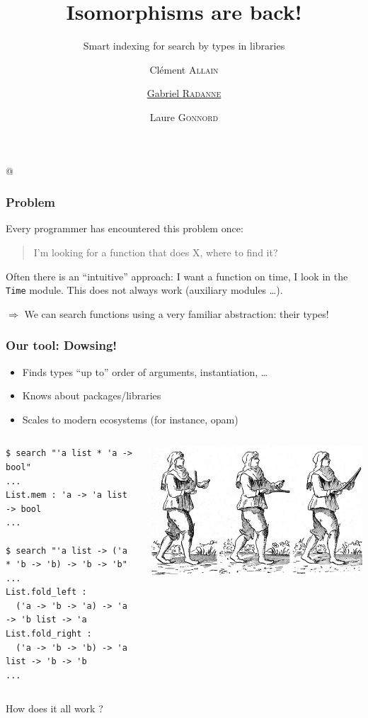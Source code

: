 \documentclass[aspectratio=169,dvipsnames,svgnames,10pt]{beamer}
\title{Isomorphisms are back!}
\subtitle{Smart indexing for search by types in libraries}
\author{
  Clément \textsc{Allain}
  \and
  \underline{Gabriel \textsc{Radanne}}
  \and
  Laure \textsc{Gonnord} \\
}
\date{}
\begin{document}
\lstMakeShortInline[keepspaces,basicstyle=\small\ttfamily]@

\begin{frame}
  \titlepage
\end{frame}

\begin{frame}[fragile]
  \frametitle{Problem}

  Every programmer has encountered this problem once:

  \begin{quotation}
    I'm looking for a function that does X, where to find it?
  \end{quotation}

  Often there is an ``intuitive'' approach: I want a function
  on time, I look in the {\color{orange}\tt Time} module.
  This does not always work (auxiliary modules \dots).

  $\Rightarrow$ We can search functions using a very familiar abstraction: their types!
  
\end{frame}

\begin{frame}[fragile]
  \frametitle{Our tool: Dowsing!}
\begin{itemize}
\item Finds types ``up to'' order of arguments, instantiation, \dots
\item Knows about packages/libraries
\item Scales to modern ecosystems (for instance, opam)
\end{itemize}
  \vfill
  \begin{columns}
    \footnotesize
\begin{verbatim}
$ search "'a list * 'a -> bool"
...
List.mem : 'a -> 'a list -> bool
...

$ search "'a list -> ('a * 'b -> 'b) -> 'b -> 'b"
...
List.fold_left :
  ('a -> 'b -> 'a) -> 'a -> 'b list -> 'a
List.fold_right :
  ('a -> 'b -> 'b) -> 'a list -> 'b -> 'b
...
\end{verbatim}
    \includegraphics{sourcier}
  \end{columns}
\pause
How does it all work ?
\end{frame}
\end{document}
